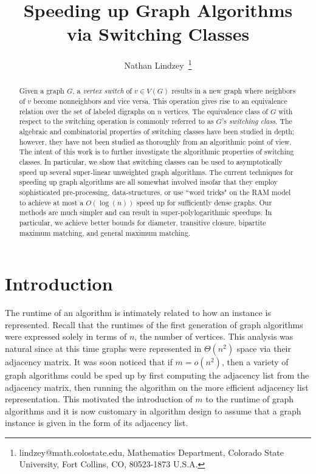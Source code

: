 \documentclass{llncs}
\begin{document}
\frenchspacing


\title{\Large Speeding up Graph Algorithms\\ via Switching Classes}
\author{Nathan Lindzey~\thanks{lindzey@math.colostate.edu,
Mathematics Department,
Colorado State University,
Fort Collins, CO, 80523-1873
U.S.A.}
}
\date{}
\maketitle


\begin{abstract} \small\baselineskip=9pt 
Given a graph $G$, a \emph{vertex switch} of $v \in V(G)$ results in a new graph where neighbors of $v$ become nonneighbors and vice versa.  This operation gives rise to an equivalence relation over the set of labeled digraphs on $n$ vertices.  The equivalence class of $G$ with respect to the switching operation is commonly referred to as $G$'s \emph{switching class}. The algebraic and combinatorial properties of switching classes have been studied in depth; however, they have not been studied as thoroughly from an algorithmic point of view.  The intent of this work is to further investigate the algorithmic properties of switching classes. In particular, we show that switching classes can be used to asymptotically speed up several super-linear unweighted graph algorithms. The current techniques for speeding up graph algorithms are all somewhat involved insofar that they employ sophisticated pre-processing, data-structures, or use ``word tricks" on the RAM model to achieve at most a $O(\log(n))$ speed up for sufficiently dense graphs.  Our methods are much simpler and can result in super-polylogarithmic speedups. In particular, we achieve better bounds for diameter, transitive closure, bipartite maximum matching, and general maximum matching.
\end{abstract}

\section{Introduction}

The runtime of an algorithm is intimately related to how an instance is represented.  
Recall that the runtimes of the first generation of graph algorithms were expressed solely in terms of $n$, the number of vertices.  This analysis was natural since at this time graphs were represented in $\Theta(n^2)$ space via their adjacency matrix.  It was soon noticed that if $m = o(n^2)$, then a variety of graph algorithms could be sped up by first computing the adjacency list from the adjacency matrix, then running the algorithm on the more efficient adjacency list representation. This motivated the introduction of $m$ to the runtime of graph algorithms and it is now customary in algorithm design to assume that a graph instance is given in the form of its adjacency list. 
\end{document}
